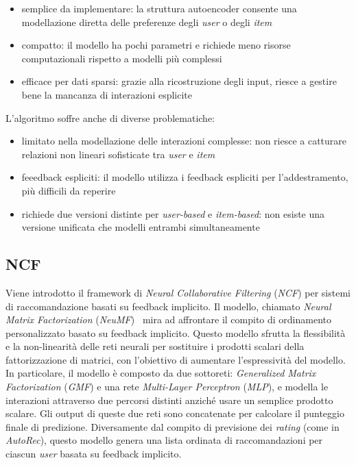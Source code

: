 \begin{itemize}
  \item semplice da implementare: la struttura autoencoder consente una modellazione diretta delle preferenze degli \textit{user} o degli \textit{item}
  \item compatto: il modello ha pochi parametri e richiede meno risorse computazionali rispetto a modelli più complessi
  \item efficace per dati sparsi: grazie alla ricostruzione degli input, riesce a gestire bene la mancanza di interazioni esplicite
\end{itemize}

L'algoritmo soffre anche di diverse problematiche:

\begin{itemize}
  \item limitato nella modellazione delle interazioni complesse: non riesce a catturare relazioni non lineari sofisticate tra \textit{user} e \textit{item}
  \item feeedback espliciti: il modello utilizza i feedback espliciti per l'addestramento, più difficili da reperire
  \item richiede due versioni distinte per \textit{user-based} e \textit{item-based}: non esiste una versione unificata che modelli entrambi simultaneamente
\end{itemize}

\subsection{NCF}\label{ncf}
Viene introdotto il framework di \textit{Neural Collaborative Filtering} (\textit{NCF}) per sistemi di raccomandazione basati su feedback implicito. Il modello, chiamato \textit{Neural Matrix Factorization} (\textit{NeuMF})~\cite{NeuMF} mira ad affrontare il compito di ordinamento personalizzato basato su feedback implicito. Questo modello sfrutta la flessibilità e la non-linearità delle reti neurali per sostituire i prodotti scalari della fattorizzazione di matrici, con l'obiettivo di aumentare l'espressività del modello. In particolare, il modello è composto da due sottoreti: \textit{Generalized Matrix Factorization} (\textit{GMF}) e una rete \textit{Multi-Layer Perceptron} (\textit{MLP}), e modella le interazioni attraverso due percorsi distinti anziché usare un semplice prodotto scalare. Gli output di queste due reti sono concatenate per calcolare il punteggio finale di predizione. Diversamente dal compito di previsione dei \textit{rating} (come in \textit{AutoRec}), questo modello genera una lista ordinata di raccomandazioni per ciascun \textit{user} basata su feedback implicito.


